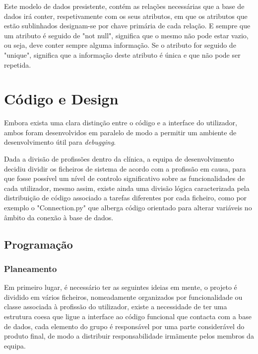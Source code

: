 \documentclass[11pt,a4paper,twoside]{report}
\begin{document}
	Este modelo de dados presistente, contém as relações necessárias que a base de dados irá conter, respetivamente com os seus atributos, em que os atributos que estão sublinhados designam-se por chave primária de cada relação. E sempre que um atributo é seguido de "not null", significa que o mesmo não pode estar vazio, ou seja, deve conter sempre alguma informação. Se o atributo for seguido de "unique", significa que a informação deste atributo é única e que não pode ser repetida.\\






\chapter{Código e Design}

	Embora exista uma clara distinção entre o código e a interface do utilizador, ambos foram desenvolvidos em paralelo de modo a permitir um ambiente de desenvolvimento útil para \textit{debugging}.
	
	Dada a divisão de profissões dentro da clínica, a equipa de desenvolvimento decidiu dividir os ficheiros de sistema de acordo com a profissão em causa, para que fosse possível um nível de controlo significativo sobre as funcionalidades de cada utilizador, mesmo assim, existe ainda uma divisão lógica caracterizada pela distribuição de código associado a tarefas diferentes por cada ficheiro, como por exemplo o "Connection.py" que alberga código orientado para alterar variáveis no âmbito da conexão à base de dados.	

\section{Programação}
	
	\subsection{Planeamento}
	
	Em primeiro lugar, é necessário ter as seguintes ideias em mente, o projeto é dividido em vários ficheiros, nomeadamente organizados por funcionalidade ou classe associada à profissão do utilizador, existe a necessidade de ter uma estrutura coesa que ligue a interface ao código funcional que contacta com a base de dados, cada elemento do grupo é responsável por uma parte considerável do produto final, de modo a distribuir responsabilidade irmãmente pelos membros da equipa.
	
\end{document}
